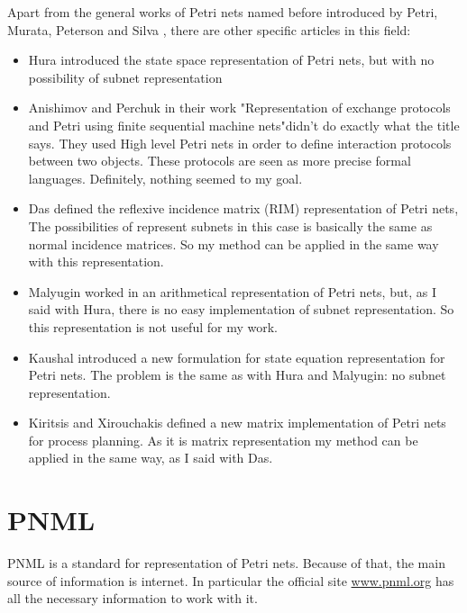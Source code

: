 Apart from the general works of Petri nets named before
introduced by Petri, Murata, Peterson and Silva \citep{G-Petri1962PhD,G-Petri1966,G-Petri1976,G-Murata1977412,G-SM-Murata19772,G-EPN-Peterson1981,G-Silva1985,G-Murata1989541,G-Silva1993,G-Silva201213},
there are other specific articles in this field:
\begin{itemize}
\item Hura \cite{REP-Hura1984865} introduced the state space representation of Petri nets, but with no possibility of subnet representation
\item Anishimov and Perchuk \cite{REP-Anisimov198690} in their work "Representation
of exchange protocols and Petri using finite sequential machine nets"didn't do exactly what the title says. They used High level Petri nets in order to define interaction protocols between two objects. These protocols are seen as more precise formal languages. Definitely, nothing seemed to my goal.   
\item Das \cite{REP-Das1987643} defined the
reflexive incidence matrix (RIM) representation of Petri nets, The possibilities
of represent subnets in this case is basically the same as 
normal incidence matrices. So my method can be applied in the same way with
this representation.
\item Malyugin \cite{REP-Malyugin1987696} worked in an arithmetical representation
of Petri nets, but, as I said with Hura, there is no easy implementation
of subnet representation.
So this representation is not useful for my work.
\item Kaushal \cite{REP-Kaushal19921083} introduced a new formulation for
state equation representation for Petri nets. The problem is the same as
with Hura and Malyugin: no subnet representation.
\item Kiritsis and Xirouchakis \cite{REP-Kiritisis2001173} defined a new
matrix implementation of Petri nets for process planning. As it is matrix representation my method can be applied in the same way, as I said with Das.  \end{itemize}
 

\section{PNML}
PNML is a standard for representation of Petri nets. Because of that, the
main source of information is internet. In particular the official site \url{www.pnml.org}
\cite{PNML-pnml.org} has all the necessary information to work with it.


